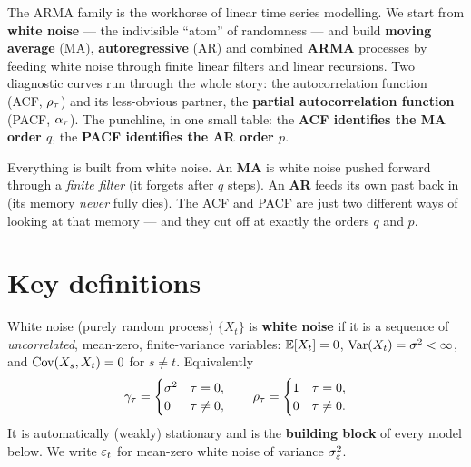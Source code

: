 \documentclass[11pt]{article}
\begin{document}

The ARMA family is the workhorse of linear time series modelling. We start from \textbf{white noise} --- the indivisible ``atom'' of randomness --- and build \textbf{moving average} (MA), \textbf{autoregressive} (AR) and combined \textbf{ARMA} processes by feeding white noise through finite linear filters and linear recursions. Two diagnostic curves run through the whole story: the autocorrelation function (ACF, $\rho_\tau$) and its less-obvious partner, the \textbf{partial autocorrelation function} (PACF, $\alpha_\tau$). The punchline, in one small table: the \textbf{ACF identifies the MA order $q$}, the \textbf{PACF identifies the AR order $p$}.

\begin{intu}
Everything is built from white noise. An \textbf{MA} is white noise pushed forward through a \emph{finite filter} (it forgets after $q$ steps). An \textbf{AR} feeds its own past back in (its memory \emph{never} fully dies). The ACF and PACF are just two different ways of looking at that memory --- and they cut off at exactly the orders $q$ and $p$.
\end{intu}

\section*{Key definitions}

\begin{defn}{White noise (purely random process)}
$\{X_t\}$ is \textbf{white noise} if it is a sequence of \emph{uncorrelated}, mean-zero, finite-variance variables: $\mathbb{E}[X_t]=0$, $\operatorname{Var}(X_t)=\sigma^2<\infty$, and $\operatorname{Cov}(X_s,X_t)=0$ for $s\ne t$. Equivalently
\[
\gamma_\tau=\begin{cases}\sigma^2 & \tau=0,\\ 0 & \tau\ne0,\end{cases}
\qquad
\rho_\tau=\begin{cases}1 & \tau=0,\\ 0 & \tau\ne0.\end{cases}
\]
It is automatically (weakly) stationary and is the \textbf{building block} of every model below. We write $\varepsilon_t$ for mean-zero white noise of variance $\sigma_\varepsilon^2$.
\end{defn}
\end{document}
